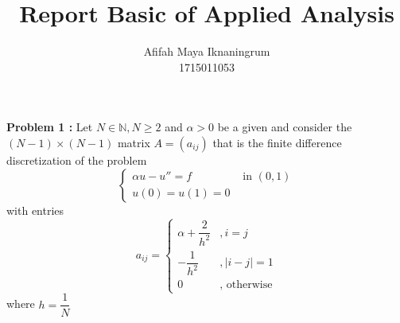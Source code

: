 \documentclass[a4paper,10pt]{article}
\title{Report Basic of Applied Analysis}
\author{Afifah Maya Iknaningrum \\ 1715011053}
\newcommand{\N}{\mathbb{N}}
\begin{document}
	\maketitle

	\textbf{Problem 1 :} Let $ N \in \N, N\geq 2$ and $ \alpha>0 $ be a given and consider the $ (N-1) \times (N-1) $ matrix $ A=(a_{ij}) $ that is the finite difference discretization of the problem
	\[ \begin{cases}
	\alpha u - u'' = f &\text{ in } (0,1)\\
	u(0) = u(1) = 0
	\end{cases} \]
	with entries
	\[ a_{ij} = \begin{cases}
	\alpha+\dfrac{2}{h^2} &,i=j \\
	-\dfrac{1}{h^2} &, |i-j|=1 \\
	0 &, \text{ otherwise}
	\end{cases} \]
	where $ h = \dfrac{1}{N} $
	
\end{document}
